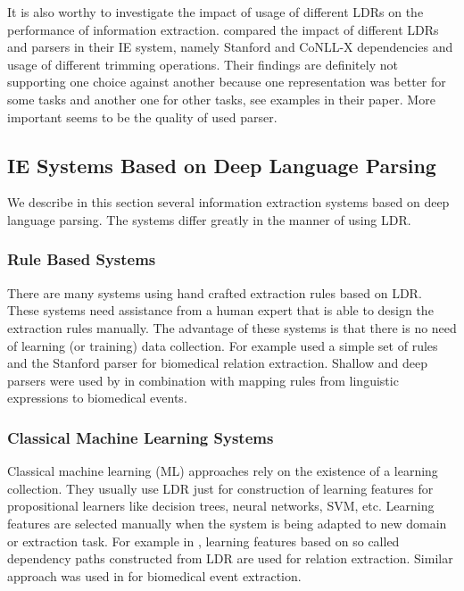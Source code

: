 It is also worthy to investigate the impact of usage of different LDRs on the performance of information extraction. \cite{Buyko:2010:EIA:1870658.1870754} compared the impact of different LDRs and parsers in their IE system, namely Stanford and CoNLL-X dependencies and usage of different trimming operations. Their findings are definitely not supporting one choice against another because one representation was better for some tasks and another one for other tasks, see examples in their paper. More important seems to be the quality of used parser.



\subsection{IE Systems Based on Deep Language Parsing} \label{sec:relwork_deep_IE_systems}


We describe in this section several information extraction systems based on deep language parsing. The systems differ greatly in the manner of using LDR.

\subsubsection{Rule Based Systems}

There are many systems using hand crafted extraction rules based on LDR. These systems need assistance from a human expert that is able to design the extraction rules manually. The advantage of these systems is that there is no need of learning (or training) data collection. For example \cite{RelEx} used a simple set of rules and the Stanford parser for biomedical relation extraction. Shallow and deep parsers were used by \cite{Yakushiji2001} in combination with mapping rules from linguistic expressions to biomedical events.


\subsubsection{Classical Machine Learning Systems}

Classical machine learning (ML) approaches rely on the existence of a learning collection. They usually use LDR just for construction of learning features for propositional learners like decision trees, neural networks, SVM, etc. Learning features are selected manually when the system is being adapted to new domain or extraction task. For example in \citep{Bunescu:DependencyPaths}, learning features based on so called dependency paths constructed from LDR are used for relation extraction. Similar approach was used in \citep{Buyko:dependencyGraphs} for biomedical event extraction.


